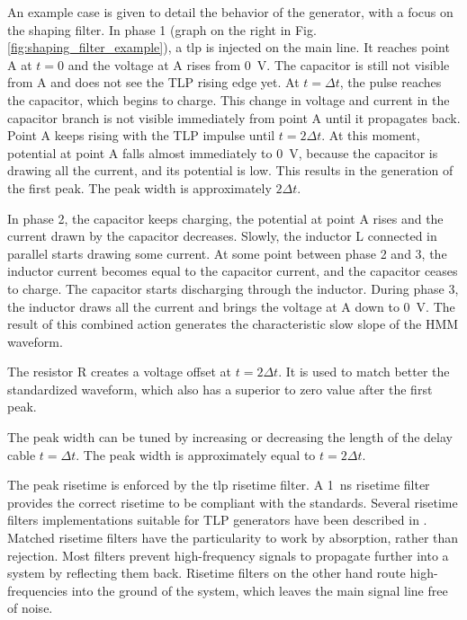 An example case is given to detail the behavior of the generator, with a focus on the shaping filter.
In phase 1 (graph on the right in Fig. \ref{fig:shaping_filter_example}), a \gls{tlp} is injected on the main line.
It reaches point A at $t=0$ and the voltage at A rises from \SI{0}{\volt}.
The capacitor is still not visible from A and does not see the TLP rising edge yet.
At $t=\Delta t$, the pulse reaches the capacitor, which begins to charge.
This change in voltage and current in the capacitor branch is not visible immediately from point A until it propagates back.
Point A keeps rising with the TLP impulse until $t=2\Delta t$.
At this moment, potential at point A falls almost immediately to \SI{0}{\volt}, because the capacitor is drawing all the current, and its potential is low.
This results in the generation of the first peak.
The peak width is approximately $2\Delta t$.

In phase 2, the capacitor keeps charging, the potential at point A rises and the current drawn by the capacitor decreases.
Slowly, the inductor L connected in parallel starts drawing some current.
At some point between phase 2 and 3, the inductor current becomes equal to the capacitor current, and the capacitor ceases to charge.
The capacitor starts discharging through the inductor.
During phase 3, the inductor draws all the current and brings the voltage at A down to \SI{0}{\volt}.
The result of this combined action generates the characteristic slow slope of the HMM waveform.

The resistor R creates a voltage offset at $t=2\Delta t$.
It is used to match better the standardized waveform, which also has a superior to zero value after the first peak.

The peak width can be tuned by increasing or decreasing the length of the delay cable $t=\Delta t$.
The peak width is approximately equal to $t=2\Delta t$.

The peak risetime is enforced by the \gls{tlp} risetime filter.
A \SI{1}{\nano\second} risetime filter provides the correct risetime to be compliant with the standards.
Several risetime filters implementations suitable for TLP generators have been described in \cite{gaussian-lpf,cao-risetime-filter}.
Matched risetime filters have the particularity to work by absorption, rather than rejection.
Most filters prevent high-frequency signals to propagate further into a system by reflecting them back.
Risetime filters on the other hand route high-frequencies into the ground of the system, which leaves the main signal line free of noise.

